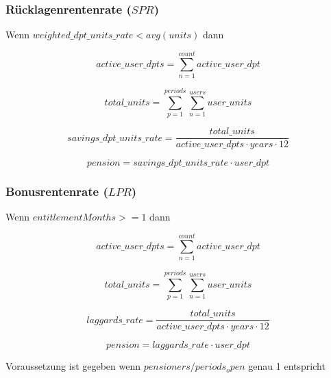 \subsubsection*{Rücklagenrentenrate ($SPR$)}

Wenn $weighted\_dpt\_units\_rate < avg(units)$ dann 

\begin{equation}
	active\_user\_dpts = 
	\sum_{n=1}^{count} active\_user\_dpt
\end{equation}

\begin{equation}
	total\_units = 	
	\sum_{p=1}^{periods} \sum_{n=1}^{users} user\_units	
\end{equation}

\begin{equation}
	savings\_dpt\_units\_rate = 	
	\frac{total\_units} 
	{active\_user\_dpts \cdot years \cdot 12}		
\end{equation}

\begin{equation}
	pension = savings\_dpt\_units\_rate \cdot user\_dpt
\end{equation}


\subsubsection*{Bonusrentenrate ($LPR$)}

Wenn $entitlementMonths >= 1$ dann 

\begin{equation*}
	active\_user\_dpts = 
	\sum_{n=1}^{count} active\_user\_dpt
\end{equation*}

\begin{equation*}
	total\_units = 	
	\sum_{p=1}^{periods} \sum_{n=1}^{users} user\_units	
\end{equation*}

\begin{equation*}
	laggards\_rate = 	
	\frac{total\_units} 
	{active\_user\_dpts \cdot years \cdot 12}		
\end{equation*}

\begin{equation*}
	pension = laggards\_rate \cdot user\_dpt
\end{equation*}


Voraussetzung ist gegeben wenn $pensioners / periods_open$ genau 1 entspricht